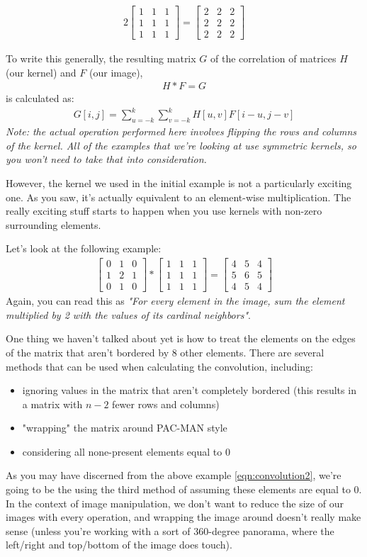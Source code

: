 \documentclass{tufte-handout}
\newcommand{\threebythree}[9]{\ensuremath{\begin{bmatrix} #1 & #2 & #3 \\ #4 & #5 & #6 \\ #7 & #8 & #9 \end{bmatrix}}}
\begin{document}
\begin{align}
    2 \threebythree{1}{1}{1}{1}{1}{1}{1}{1}{1} = \threebythree{2}{2}{2}{2}{2}{2}{2}{2}{2}
\end{align}

To write this generally, the resulting matrix $G$ of the correlation of matrices $H$ (our kernel) and $F$ (our image),
\begin{align}
    H * F = G
\end{align}
is calculated as:
\begin{align}
    G[i, j] = \sum_{u=-k}^{k} \sum_{v=-k}^{k} H[u, v] F[i - u, j - v]
\end{align}
\emph{Note: the actual operation performed here involves flipping the rows and columns of the kernel. All of the examples that we're looking at use symmetric kernels, so you won't need to take that into consideration.}

However, the kernel we used in the initial example is not a particularly exciting one. As you saw, it's actually equivalent to an element-wise multiplication. The really exciting stuff starts to happen when you use kernels with non-zero surrounding elements.

Let's look at the following example:
\begin{align}\label{eqn:convolution2}
    \threebythree{0}{1}{0}{1}{2}{1}{0}{1}{0} * \threebythree{1}{1}{1}{1}{1}{1}{1}{1}{1} =
    \threebythree{4}{5}{4}{5}{6}{5}{4}{5}{4}
\end{align}
Again, you can read this as \emph{"For every element in the image, sum the element multiplied by 2 with the values of its cardinal neighbors"}.

One thing we haven't talked about yet is how to treat the elements on the edges of the matrix that aren't bordered by 8 other elements. There are several methods that can be used when calculating the convolution, including:
\begin{itemize}
    \item ignoring values in the matrix that aren't completely bordered (this results in a matrix with $n-2$ fewer rows and columns)
    \item "wrapping" the matrix around PAC-MAN style
    \item considering all none-present elements equal to 0
\end{itemize}
As you may have discerned from the above example \eqref{eqn:convolution2}, we're going to be the using the third method of assuming these elements are equal to 0. In the context of image manipulation, we don't want to reduce the size of our images with every operation, and wrapping the image around doesn't really make sense (unless you're working with a sort of 360-degree panorama, where the left/right and top/bottom of the image does touch).
\end{document}
